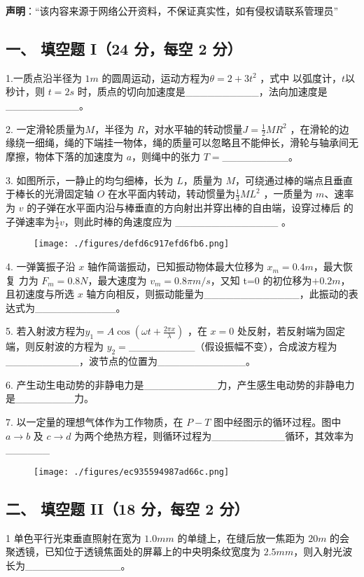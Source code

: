 
\textbf{声明}：“该内容来源于网络公开资料，不保证真实性，如有侵权请联系管理员”

\subsection{一、 填空题 I（24 分，每空 2 分）}
1.一质点沿半径为 $1m$ 的圆周运动，运动方程为$\theta=2+3t^2$ ，式中 以弧度计，$t$以秒计，则 $t=2s$ 时，质点的切向加速度是__________，法向加速度是__________。

2. 一定滑轮质量为$M$，半径为 $R$，对水平轴的转动惯量$J=\frac{1}{2}MR^2$ ，在滑轮的边缘绕一细绳，绳的下端挂一物体，绳的质量可以忽略且不能伸长，滑轮与轴承间无摩擦，物体下落的加速度为 $a$，则绳中的张力 $T=$_________。

3. 如图所示，一静止的均匀细棒，长为 $L$，质量为 $M$，可绕通过棒的端点且垂直于棒长的光滑固定轴 $O$ 在水平面内转动，转动惯量为$\frac{1}{3}ML^2$ ，一质量为 $m$、速率为 $v$ 的子弹在水平面内沿与棒垂直的方向射出并穿出棒的自由端，设穿过棒后 的子弹速率为$\frac{1}{2}v$，则此时棒的角速度应为 ______________ 。
\begin{figure}[ht]
\centering
\texttt{[image: ./figures/defd6c917efd6fb6.png]}
\caption{} \label{fig_NJUD5_1}
\end{figure}
4. 一弹簧振子沿 $x$ 轴作简谐振动，已知振动物体最大位移为 $x_m=0.4m$，最大恢复
力为 $F_m=0.8N$，最大速度为 $v_m=0.8\pi m/s$，又知 t=0 的初位移为$+0.2m$，且初速度与所选 $x$ 轴方向相反，则振动能量为_____________，此振动的表达式为___________。

5. 若入射波方程为$y_1=A\cos(\omega t+\frac{2\pi x}{\lambda})$ ，在 $x=0$ 处反射，若反射端为固定端，则反射波的方程为 $y_2=$_________（假设振幅不变），合成波方程为__________，波节点的位置为____________。

6. 产生动生电动势的非静电力是__________力，产生感生电动势的非静电力是________力。

7. 以一定量的理想气体作为工作物质，在 $P-T$ 图中经图示的循环过程。图中$a\to b$ 及 $c\to d$ 为两个绝热方程，则循环过程为__________循环，其效率为______
\begin{figure}[ht]
\centering
\texttt{[image: ./figures/ec935594987ad66c.png]}
\caption{} \label{fig_NJUD5_2}
\end{figure}
\subsection{二、 填空题 II（18 分，每空 2 分）}
1 单色平行光束垂直照射在宽为 $1.0mm$ 的单缝上，在缝后放一焦距为 $20m$ 的会聚透镜，已知位于透镜焦面处的屏幕上的中央明条纹宽度为 $2.5mm$，则入射光波长为_____________。

